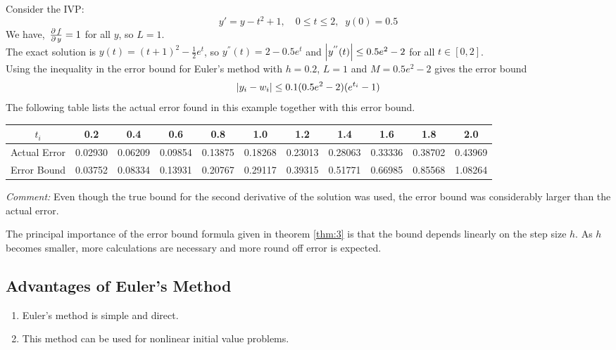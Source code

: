 \documentclass[../main-sheet.tex]{subfiles}
\begin{document}
    \begin{ex}
        Consider the IVP:
        \[
            y'=y-t^2+1,\quad 0\leq t\leq 2,\;\;y(0)=0.5
        \]
        We have, \(\,\frac{\partial\, f}{\partial\, y}=1\) for all \(y\), so \(L=1\).\\
        The exact solution is \(y(t)=(t+1)^2-\frac{1}{2}e^t\), so \(y^{''}(t)=2-0.5e^t\) and \(\left\vert y^{''}(t)\right\vert\leq 0.5e^2-2\) for all \(t\in [0,2]\).\\
        Using the inequality in the error bound for Euler's  method with \(h=0.2\), \(L=1\) and \(M=0.5e^2-2\) gives the error bound
        \[
            \left\vert y_i-w_i\right\vert\leq 0.1 (0.5e^2-2)(e^{t_i}-1)
        \]
        The following table lists the actual error found in this example together with this error bound.
        \begin{table}[H]
            \centering
            \begin{tabular}{ccccccccccc}
                \toprule
                \(t_i\) & 0.2 & 0.4 & 0.6 & 0.8 & 1.0 & 1.2 & 1.4 & 1.6 & 1.8 & 2.0\\\midrule
                Actual Error & 0.02930 & 0.06209 & 0.09854 & 0.13875 & 0.18268 & 0.23013 & 0.28063 & 0.33336 & 0.38702 & 0.43969\\
                Error Bound & 0.03752 & 0.08334 & 0.13931 & 0.20767 & 0.29117 & 0.39315 & 0.51771 & 0.66985 & 0.85568 & 1.08264\\
                \bottomrule
            \end{tabular}
        \end{table}
    \end{ex}
        \emph{Comment:} Even though the true bound for the second derivative of the solution was used, the error bound was considerably larger than the actual error.

    The principal importance of the error bound formula given in theorem \ref{thm:3} is that the bound depends linearly on the step size \(h\). As \(h\) becomes smaller, more calculations are necessary and more round off error is expected.
    \subsection{Advantages of Euler's Method}
    \begin{enumerate}
        \item Euler's method is simple and direct.
        \item This method can be used for nonlinear initial value problems.
    \end{enumerate}
\end{document}

